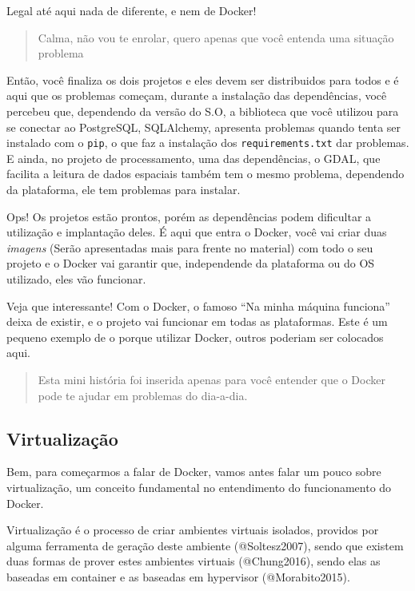 \documentclass[]{article}
\begin{document}
Legal até aqui nada de diferente, e nem de Docker!

\begin{quote}
Calma, não vou te enrolar, quero apenas que você entenda uma situação problema
\end{quote}

Então, você finaliza os dois projetos e eles devem ser distribuidos para todos e é aqui que os problemas começam, durante a instalação das dependências, você percebeu que, dependendo da versão do S.O, a biblioteca que você utilizou para se conectar ao PostgreSQL, SQLAlchemy, apresenta problemas quando tenta ser instalado com o \texttt{pip}, o que faz a instalação dos \texttt{requirements.txt} dar problemas. E ainda, no projeto de processamento, uma das dependências, o GDAL, que facilita a leitura de dados espaciais também tem o mesmo problema, dependendo da plataforma, ele tem problemas para instalar.

Ops! Os projetos estão prontos, porém as dependências podem dificultar a utilização e implantação deles. É aqui que entra o Docker, você vai criar duas \emph{imagens} (Serão apresentadas mais para frente no material) com todo o seu projeto e o Docker vai garantir que, independende da plataforma ou do OS utilizado, eles vão funcionar.

Veja que interessante! Com o Docker, o famoso ``Na minha máquina funciona'' deixa de existir, e o projeto vai funcionar em todas as plataformas. Este é um pequeno exemplo de o porque utilizar Docker, outros poderiam ser colocados aqui.

\begin{quote}
Esta mini história foi inserida apenas para você entender que o Docker pode te ajudar em problemas do dia-a-dia.
\end{quote}

\hypertarget{virtualizacao}{%
\subsection{Virtualização}\label{virtualizacao}}

Bem, para começarmos a falar de Docker, vamos antes falar um pouco sobre virtualização, um conceito fundamental no entendimento do funcionamento do Docker.

Virtualização é o processo de criar ambientes virtuais isolados, providos por alguma ferramenta de geração deste ambiente (@Soltesz2007), sendo que existem duas formas de prover estes ambientes virtuais (@Chung2016), sendo elas as baseadas em container e as baseadas em hypervisor (@Morabito2015).
\end{document}
